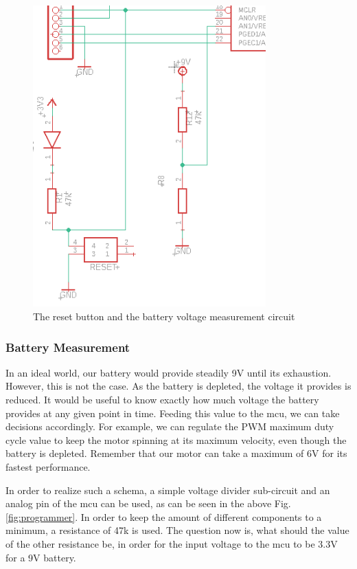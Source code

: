 \begin{figure}[htb]
    \centering
    \includegraphics[width=0.8\textwidth]{figures/hardware/MCLRandBatteryMeasurement.PNG}
    \caption{The reset button and the battery voltage measurement circuit}
    \label{fig:reset}
\end{figure}

\FloatBarrier
\vspace{1cm}


\subsubsection{Battery Measurement}

In an ideal world, our battery would provide steadily 9V until its exhaustion. However, this is not the case. As the battery is depleted, the voltage it provides is reduced. It would be useful to know exactly how much voltage the battery provides at any given point in time. Feeding this value to the mcu, we can take decisions accordingly. For example, we can regulate the PWM maximum duty cycle value to keep the motor spinning at its maximum velocity, even though the battery is depleted. Remember that our motor can take a maximum of 6V for its fastest performance.

In order to realize such a schema, a simple voltage divider sub-circuit and an analog pin of the mcu can be used, as can be seen in the above Fig. \ref{fig:programmer}.
In order to keep the amount of different components to a minimum, a resistance of 47k is used. The question now is, what should the value of the other resistance be, in order for the input voltage to the mcu to be 3.3V for a 9V battery. 

